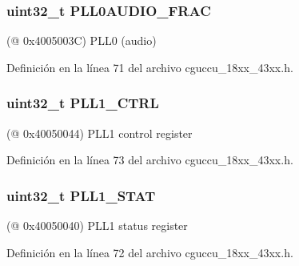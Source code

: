 \subsubsection[{\texorpdfstring{P\+L\+L0\+A\+U\+D\+I\+O\+\_\+\+F\+R\+AC}{PLL0AUDIO_FRAC}}]{ uint32\+\_\+t P\+L\+L0\+A\+U\+D\+I\+O\+\_\+\+F\+R\+AC}\hypertarget{struct_l_p_c___c_g_u___t_ae4d55c3e2485ac46e29efffa250d1fb1}{}\label{struct_l_p_c___c_g_u___t_ae4d55c3e2485ac46e29efffa250d1fb1}
(@ 0x4005003C) P\+L\+L0 (audio) 

Definición en la línea 71 del archivo cguccu\+\_\+18xx\+\_\+43xx.\+h.

\subsubsection[{\texorpdfstring{P\+L\+L1\+\_\+\+C\+T\+RL}{PLL1_CTRL}}]{ uint32\+\_\+t P\+L\+L1\+\_\+\+C\+T\+RL}\hypertarget{struct_l_p_c___c_g_u___t_a511841aab4fd9006722c9a4130315614}{}\label{struct_l_p_c___c_g_u___t_a511841aab4fd9006722c9a4130315614}
(@ 0x40050044) P\+L\+L1 control register 

Definición en la línea 73 del archivo cguccu\+\_\+18xx\+\_\+43xx.\+h.

\subsubsection[{\texorpdfstring{P\+L\+L1\+\_\+\+S\+T\+AT}{PLL1_STAT}}]{ uint32\+\_\+t P\+L\+L1\+\_\+\+S\+T\+AT}\hypertarget{struct_l_p_c___c_g_u___t_a2142c26f9eba82a8d115d2ab457f2287}{}\label{struct_l_p_c___c_g_u___t_a2142c26f9eba82a8d115d2ab457f2287}
(@ 0x40050040) P\+L\+L1 status register 

Definición en la línea 72 del archivo cguccu\+\_\+18xx\+\_\+43xx.\+h.


